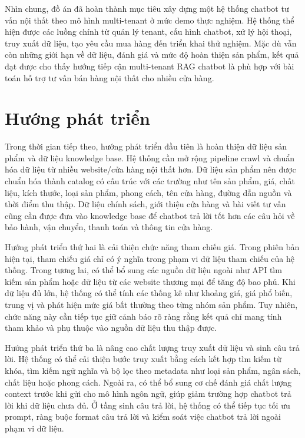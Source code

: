 \documentclass[../DoAn.tex]{subfiles}
\begin{document}
Nhìn chung, đồ án đã hoàn thành mục tiêu xây dựng một hệ thống chatbot tư vấn nội thất theo mô hình multi-tenant ở mức demo thực nghiệm. Hệ thống thể hiện được các luồng chính từ quản lý tenant, cấu hình chatbot, xử lý hội thoại, truy xuất dữ liệu, tạo yêu cầu mua hàng đến triển khai thử nghiệm. Mặc dù vẫn còn những giới hạn về dữ liệu, đánh giá và mức độ hoàn thiện sản phẩm, kết quả đạt được cho thấy hướng tiếp cận multi-tenant RAG chatbot là phù hợp với bài toán hỗ trợ tư vấn bán hàng nội thất cho nhiều cửa hàng.

\section{Hướng phát triển}

Trong thời gian tiếp theo, hướng phát triển đầu tiên là hoàn thiện dữ liệu sản phẩm và dữ liệu knowledge base. Hệ thống cần mở rộng pipeline crawl và chuẩn hóa dữ liệu từ nhiều website/cửa hàng nội thất hơn. Dữ liệu sản phẩm nên được chuẩn hóa thành catalog có cấu trúc với các trường như tên sản phẩm, giá, chất liệu, kích thước, loại sản phẩm, phong cách, tên cửa hàng, đường dẫn nguồn và thời điểm thu thập. Dữ liệu chính sách, giới thiệu cửa hàng và bài viết tư vấn cũng cần được đưa vào knowledge base để chatbot trả lời tốt hơn các câu hỏi về bảo hành, vận chuyển, thanh toán và thông tin cửa hàng.

Hướng phát triển thứ hai là cải thiện chức năng tham chiếu giá. Trong phiên bản hiện tại, tham chiếu giá chỉ có ý nghĩa trong phạm vi dữ liệu tham chiếu của hệ thống. Trong tương lai, có thể bổ sung các nguồn dữ liệu ngoài như API tìm kiếm sản phẩm hoặc dữ liệu từ các website thương mại để tăng độ bao phủ. Khi dữ liệu đủ lớn, hệ thống có thể tính các thống kê như khoảng giá, giá phổ biến, trung vị và phát hiện mức giá bất thường theo từng nhóm sản phẩm. Tuy nhiên, chức năng này cần tiếp tục giữ cảnh báo rõ ràng rằng kết quả chỉ mang tính tham khảo và phụ thuộc vào nguồn dữ liệu thu thập được.

Hướng phát triển thứ ba là nâng cao chất lượng truy xuất dữ liệu và sinh câu trả lời. Hệ thống có thể cải thiện bước truy xuất bằng cách kết hợp tìm kiếm từ khóa, tìm kiếm ngữ nghĩa và bộ lọc theo metadata như loại sản phẩm, ngân sách, chất liệu hoặc phong cách. Ngoài ra, có thể bổ sung cơ chế đánh giá chất lượng context trước khi gửi cho mô hình ngôn ngữ, giúp giảm trường hợp chatbot trả lời khi dữ liệu chưa đủ. Ở tầng sinh câu trả lời, hệ thống có thể tiếp tục tối ưu prompt, ràng buộc format câu trả lời và kiểm soát việc chatbot trả lời ngoài phạm vi dữ liệu.
\end{document}
